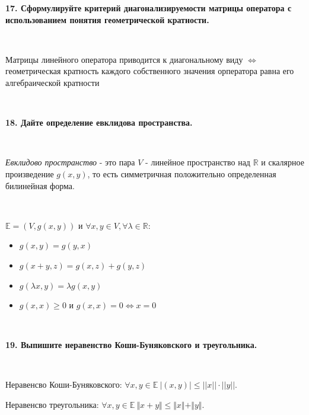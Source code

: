 \documentclass{article}
\begin{document}
    \textbf{17. Сформулируйте критерий диагонализируемости матрицы оператора с использованием понятия геометрической кратности.}

    $\;$
        {
        \setlength{\parindent}{0.4cm}
        \hangindent=0.4cm

        Матрицы линейного оператора приводится к диагональному виду $\Leftrightarrow$ геометрическая кратность каждого собственного значения орператора равна его алгебраической кратности

        $\;$
        \setlength{\parindent}{0cm}
        \hangindent=0cm
    }

    \textbf{18. Дайте определение евклидова пространства.}

    $\;$
        {
        \setlength{\parindent}{0.4cm}
        \hangindent=0.4cm

        \textit{Евклидово пространство} - это пара $V$ - линейное пространство над $\mathbb{R}$ и скалярное произведение $g(x,y)$, то есть симметричная положительно определенная билинейная форма.

        $\;$

        \setlength{\parindent}{0.8cm}
        \hangindent=0.8cm

        $\mathbb{E} = (V, g(x,y))$ и $\forall x, y \in V, \forall \lambda \in \mathbb{R}$:

        \begin{itemize}

            \item  $g(x,y) = g(y,x)$
            \item  $g(x + y, z) = g(x, z) + g(y, z)$
            \item $g(\lambda x, y) = \lambda g(x, y)$
            \item  $g(x, x) \geq 0$ и $ g(x, x) = 0 \Leftrightarrow x= 0$

        \end{itemize}

        \setlength{\parindent}{0.4cm}
        \hangindent=0.4cm

        $\;$
        \setlength{\parindent}{0cm}
        \hangindent=0cm
    }

    \textbf{19. Выпишите неравенство Коши-Буняковского и треугольника.}

    $\;$
        {
        \setlength{\parindent}{0.4cm}
        \hangindent=0.4cm

        Неравенсво Коши-Буняковского: $\forall x, y \in \mathbb{E} \  |(x, y)|\leq||x||\cdot||y||. $

        Неравенсво треугольника: $\forall x, y \in \mathbb{E} \ \Vert x + y \Vert \leq \Vert x \Vert + \Vert y \Vert. $

        $\;$
        \setlength{\parindent}{0cm}
        \hangindent=0cm
    }
\end{document}
